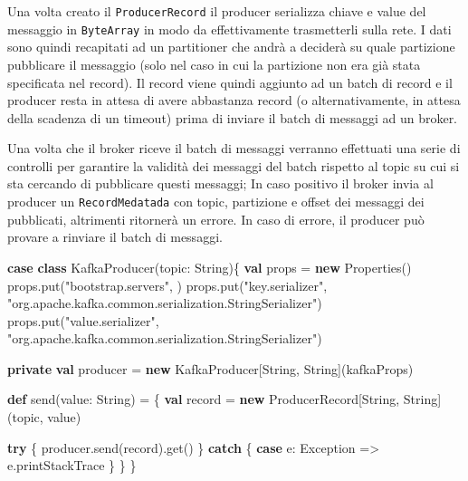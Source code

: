 \documentclass[]{article}
\newenvironment{Shaded}{}{}
\newcommand{\KeywordTok}[1]{\textcolor[rgb]{0.00,0.44,0.13}{\textbf{#1}}}
\newcommand{\StringTok}[1]{\textcolor[rgb]{0.25,0.44,0.63}{#1}}
\newcommand{\FunctionTok}[1]{\textcolor[rgb]{0.02,0.16,0.49}{#1}}
\newcommand{\NormalTok}[1]{#1}
\begin{document}
Una volta creato il \texttt{ProducerRecord} il producer serializza
chiave e value del messaggio in \texttt{ByteArray} in modo da
effettivamente trasmetterli sulla rete. I dati sono quindi recapitati ad
un partitioner che andrà a deciderà su quale partizione pubblicare il
messaggio (solo nel caso in cui la partizione non era già stata
specificata nel record). Il record viene quindi aggiunto ad un batch di
record e il producer resta in attesa di avere abbastanza record (o
alternativamente, in attesa della scadenza di un timeout) prima di
inviare il batch di messaggi ad un broker.

Una volta che il broker riceve il batch di messaggi verranno effettuati
una serie di controlli per garantire la validità dei messaggi del batch
rispetto al topic su cui si sta cercando di pubblicare questi messaggi;
In caso positivo il broker invia al producer un \texttt{RecordMedatada}
con topic, partizione e offset dei messaggi dei pubblicati, altrimenti
ritornerà un errore. In caso di errore, il producer può provare a
rinviare il batch di messaggi.

\small

\begin{Shaded}
\begin{Highlighting}[]
\KeywordTok{case} \KeywordTok{class} \FunctionTok{KafkaProducer}\NormalTok{(topic: String)\{}
    \KeywordTok{val}\NormalTok{ props = }\KeywordTok{new}\NormalTok{ Properties()}
\NormalTok{    props.}\FunctionTok{put}\NormalTok{(}\StringTok{"bootstrap.servers"}\NormalTok{, )}
\NormalTok{    props.}\FunctionTok{put}\NormalTok{(}\StringTok{"key.serializer"}\NormalTok{, }
        \StringTok{"org.apache.kafka.common.serialization.StringSerializer"}\NormalTok{)}
\NormalTok{    props.}\FunctionTok{put}\NormalTok{(}\StringTok{"value.serializer"}\NormalTok{, }
        \StringTok{"org.apache.kafka.common.serialization.StringSerializer"}\NormalTok{)}
    
    \KeywordTok{private} \KeywordTok{val}\NormalTok{ producer = }\KeywordTok{new}\NormalTok{ KafkaProducer[String, String](kafkaProps)    }
    
    \KeywordTok{def} \FunctionTok{send}\NormalTok{(value: String) = \{}
      \KeywordTok{val}\NormalTok{ record = }\KeywordTok{new}\NormalTok{ ProducerRecord[String, String](topic, value)}

      \KeywordTok{try}\NormalTok{ \{}
\NormalTok{        producer.}\FunctionTok{send}\NormalTok{(record).}\FunctionTok{get}\NormalTok{()}
\NormalTok{      \} }\KeywordTok{catch}\NormalTok{ \{}
        \KeywordTok{case}\NormalTok{ e: Exception => e.}\FunctionTok{printStackTrace}
\NormalTok{      \}}
\NormalTok{    \}   }
\NormalTok{\}}
\end{Highlighting}
\end{Shaded}
\end{document}

